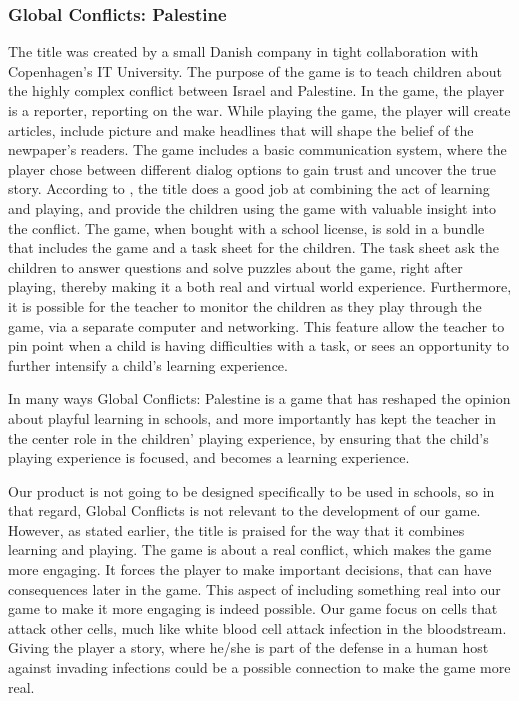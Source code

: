 \subsubsection{Global Conflicts: Palestine}

The title was created by a small Danish company in tight collaboration with Copenhagen's IT University.
The purpose of the game is to teach children about the highly complex conflict between Israel and Palestine. In the game, the player is a reporter, reporting on the war. While playing the game, the player will create articles, include picture and make headlines that will shape the belief of the newpaper's readers. The game includes a basic communication system, where the player chose between different dialog options to gain trust and uncover the true story. According to \cite{laeringpaaspil}, the title does a good job at combining the act of learning and playing, and provide the children using the game with valuable insight into the conflict.
The game, when bought with a school license, is sold in a bundle that includes the game and a task sheet for the children.
The task sheet ask the children to answer questions and solve puzzles about the game, right after playing, thereby making it a both real and virtual world experience.
Furthermore, it is possible for the teacher to monitor the children as they play through the game, via a separate computer and networking.
This feature allow the teacher to pin point when a child is having difficulties with a task, or sees an opportunity to further intensify a child's learning experience.\newline

In many ways Global Conflicts: Palestine is a game that has reshaped the opinion about playful learning in schools, and more importantly has kept the teacher in the center role in the children' playing experience, by ensuring that the child's playing experience is focused, and becomes a learning experience.\cite{laeringpaaspil}\newline

Our product is not going to be designed specifically to be used in schools, so in that regard, Global Conflicts is not relevant to the development of our game. However, as stated earlier, the title is praised for the way that it combines learning and playing. The game is about a real conflict, which makes the game more engaging. It forces the player to make important decisions, that can have consequences later in the game. This aspect of including something real into our game to make it more engaging is indeed possible.
Our game focus on cells that attack other cells, much like white blood cell attack infection in the bloodstream. Giving the player a story, where he/she is part of the defense in a human host against invading infections could be a possible connection to make the game more real.

